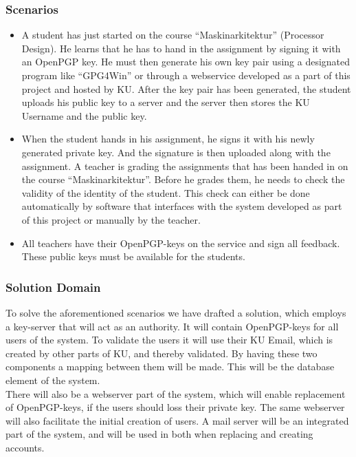\documentclass[11pt,a4paper]{article}
\begin{document}
\subsubsection{Scenarios}
\begin{itemize}
\item A student has just started on the course ``Maskinarkitektur'' (Processor Design). He learns that he has to hand in the assignment by signing it with an OpenPGP key. He must then generate his own key pair using a designated program like ``GPG4Win'' or through a webservice developed as a part of this project and hosted by KU. After the key pair has been generated, the student uploads his public key to a server and the server then stores the KU Username and the public key.
\item When the student hands in his assignment, he signs it with his newly generated private key. And the signature is then uploaded along with the assignment. A teacher is grading the assignments that has been handed in on the course ``Maskinarkitektur''. Before he grades them, he needs to check the validity of the identity of the student. This check can either be done automatically by software that interfaces with the system developed as part of this project or manually by the teacher.
\item All teachers have their OpenPGP-keys on the service and sign all feedback. These public keys must be available for the students.
\end{itemize}

\subsubsection{Solution Domain}


To solve the aforementioned scenarios we have drafted a solution, which employs a key-server that will act as an authority. It will contain OpenPGP-keys for all users of the system. To validate the users it will use their KU Email, which is created by other parts of KU, and thereby validated. By having these two components a mapping between them will be made. This will be the database element of the system.\\

There will also be a webserver part of the system, which will enable replacement of OpenPGP-keys, if the users should loss their private key. The same webserver will also facilitate the initial creation of users. A mail server will be an integrated part of the system, and will be used in both when replacing and creating accounts.\\
\end{document}
